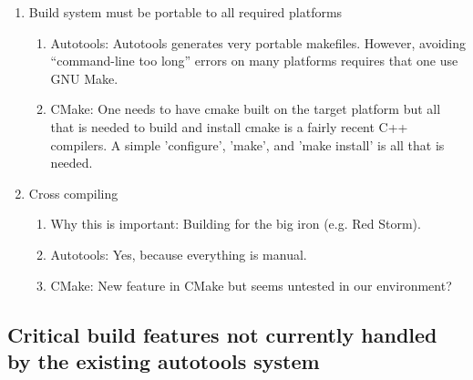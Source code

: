 \documentclass[pdf,ps2pdf,11pt]{SANDreport}
\begin{document}
\begin{enumerate}
{}\item Build system must be portable to all required platforms

  \begin{enumerate}

  {}\item Autotools: Autotools generates very portable makefiles.
  However, avoiding ``command-line too long'' errors on many
  platforms requires that one use GNU Make.

  {}\item CMake: One needs to have cmake built on the target
  platform but all that is needed to build and install cmake is a
  fairly recent C++ compilers.  A simple 'configure', 'make', and
  'make install' is all that is needed. 

  \end{enumerate}

{}\item Cross compiling

  \begin{enumerate}

  {}\item Why this is important: Building for the big iron (e.g. Red Storm).

  {}\item Autotools: Yes, because everything is manual.

  {}\item CMake: New feature in CMake but seems untested in our
  environment?

  \end{enumerate}

\end{enumerate}

%
{}\subsection{Critical build features not currently handled by the
existing autotools system}
%
\end{document}
